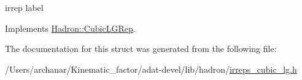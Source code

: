 irrep label 

Implements \mbox{\hyperlink{structHadron_1_1CubicLGRep_a50f5ddbb8f4be4cee0106fa9e8c75e6c}{Hadron\+::\+Cubic\+L\+G\+Rep}}.



The documentation for this struct was generated from the following file\+:\begin{DoxyCompactItemize}
\item 
/\+Users/archanar/\+Kinematic\+\_\+factor/adat-\/devel/lib/hadron/\mbox{\hyperlink{adat-devel_2lib_2hadron_2irreps__cubic__lg_8h}{irreps\+\_\+cubic\+\_\+lg.\+h}}\end{DoxyCompactItemize}

